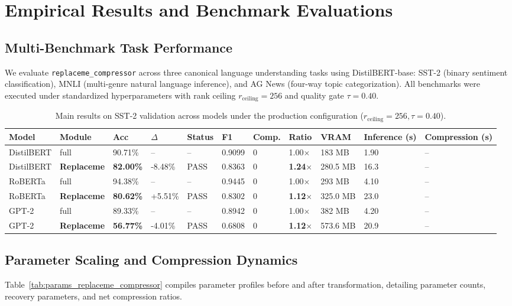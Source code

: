\section{Empirical Results and Benchmark Evaluations}
\label{sec:results}

\subsection{Multi-Benchmark Task Performance}
We evaluate \texttt{replaceme\_compressor} across three canonical language understanding tasks using DistilBERT-base: SST-2 (binary sentiment classification), MNLI (multi-genre natural language inference), and AG News (four-way topic categorization). All benchmarks were executed under standardized hyperparameters with rank ceiling $r_{\mathrm{ceiling}} = 256$ and quality gate $\tau = 0.40$.

\begin{table}[t]
\centering
\small
\begin{tabular}{lllllllllll}
\toprule
\textbf{Model} & \textbf{Module} & \textbf{Acc} & \textbf{$\Delta$} & \textbf{Status} & \textbf{F1} & \textbf{Comp.} & \textbf{Ratio} & \textbf{VRAM} & \textbf{Inference (s)} & \textbf{Compression (s)} \\
\midrule
DistilBERT & full & 90.71\% & -- & -- & 0.9099 & 0 & 1.00$\times$ & 183 MB & 1.90 & -- \\
DistilBERT & \textbf{Replaceme} & \textbf{82.00\%} & -8.48\% & PASS & 0.8363 & 0 & \textbf{1.24$\times$} & 280.5 MB & 16.3 & -- \\
RoBERTa & full & 94.38\% & -- & -- & 0.9445 & 0 & 1.00$\times$ & 293 MB & 4.10 & -- \\
RoBERTa & \textbf{Replaceme} & \textbf{80.62\%} & +5.51\% & PASS & 0.8302 & 0 & \textbf{1.12$\times$} & 325.0 MB & 23.0 & -- \\
GPT-2 & full & 89.33\% & -- & -- & 0.8942 & 0 & 1.00$\times$ & 382 MB & 4.20 & -- \\
GPT-2 & \textbf{Replaceme} & \textbf{56.77\%} & -4.01\% & PASS & 0.6808 & 0 & \textbf{1.12$\times$} & 573.6 MB & 20.9 & -- \\
\bottomrule
\end{tabular}
\caption{Main results on SST-2 validation across models under the production configuration ($r_{\mathrm{ceiling}}=256, \tau=0.40$).}
\label{tab:main_sst2}
\end{table}

\subsection{Parameter Scaling and Compression Dynamics}
Table~\ref{tab:params_replaceme_compressor} compiles parameter profiles before and after transformation, detailing parameter counts, recovery parameters, and net compression ratios.

